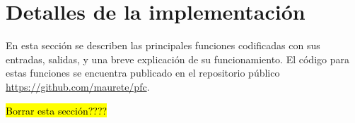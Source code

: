 %
%
\section{Detalles de la implementación}
%
En esta sección se describen las principales funciones codificadas con
sus entradas, salidas, y una breve explicación de su funcionamiento.
El código para estas funciones se encuentra publicado en el
repositorio público \url{https://github.com/maurete/pfc}.

\hl{Borrar esta sección????}
